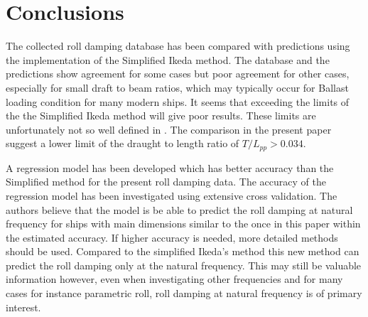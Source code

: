 \section{Conclusions}
\label{se:conclusions}
The collected roll damping database has been compared with predictions using the implementation of the Simplified Ikeda method. The database and the predictions show agreement for some cases but poor agreement for other cases, especially for small draft to beam ratios, which may typically occur for Ballast loading condition for many modern ships. It seems that exceeding the limits of the the Simplified Ikeda method will give poor results. These limits are unfortunately not so well defined in \parencite{kawahara_simple_2011}. The comparison in the present paper suggest a lower limit of the draught to length ratio of $T/L_{pp}>0.034$.

A regression model has been developed which has better accuracy than the Simplified method for the present roll damping data. The accuracy of the regression model has been investigated using extensive cross validation. The authors believe that the model is be able to predict the roll damping at natural frequency for ships with main dimensions similar to the once in this paper within the estimated accuracy. If higher accuracy is needed, more detailed methods should be used. Compared to the simplified Ikeda's method this new method can predict the roll damping only at the natural frequency. This may still be valuable information however, even when investigating other frequencies and for many cases for instance parametric roll, roll damping at natural frequency is of primary interest.

